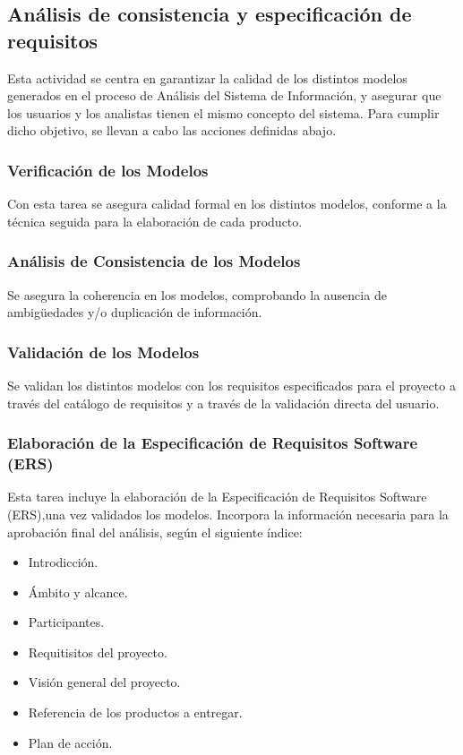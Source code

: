 \documentclass[11pt,a4paper,spanish,twoside]{report}
\begin{document}
\subsection{Análisis de consistencia y especificación de requisitos}
Esta actividad se centra en garantizar la calidad de los distintos modelos
generados en el proceso de Análisis del Sistema de Información, y asegurar
que los usuarios y los analistas tienen el mismo concepto del sistema. Para
cumplir dicho objetivo, se llevan a cabo las acciones definidas abajo.  

\subsubsection{Verificación de los Modelos}
Con esta tarea se asegura calidad formal en los distintos modelos, conforme a 
la técnica seguida para la elaboración de cada producto.

\subsubsection{Análisis de Consistencia de los Modelos}
Se asegura la coherencia en los modelos, comprobando la ausencia de
ambigüedades y/o duplicación de información. 

\subsubsection{Validación de los Modelos}
Se validan los distintos modelos con los requisitos especificados para el
proyecto a través del catálogo de requisitos y a través de la validación
directa del usuario. 


\subsubsection{Elaboración de la Especificación de Requisitos Software (ERS)}
Esta tarea incluye la elaboración de la Especificación de Requisitos Software
(ERS),una vez validados los modelos. Incorpora la información necesaria para
la aprobación final del análisis, según el siguiente índice:
\begin{itemize}
\item Introdicción.
\item Ámbito y alcance.
\item Participantes.
\item Requitisitos del proyecto.
\item Visión general del proyecto.
\item Referencia de los productos a entregar.
\item Plan de acción.
\end{itemize}
 
\end{document}
